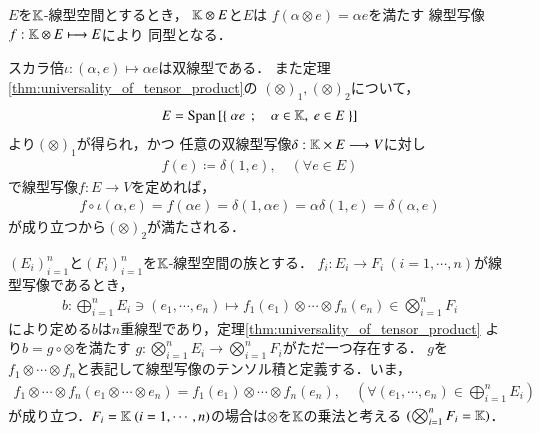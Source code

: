 	\begin{screen}
		\begin{thm}[スカラーとのテンソル積]\label{thm:tensor_product_with_scalar}
			$E$を$\mathbb{K}$-線型空間とするとき，
			$\mathbb{K} \otimes E$と$E$は
			$f(\alpha \otimes e) = \alpha e$を満たす
			線型写像$f:\mathbb{K} \otimes E \longmapsto E$により
			同型となる．
		\end{thm}
	\end{screen}
	
	\begin{prf}
		スカラ倍$\iota:(\alpha, e) \longmapsto \alpha e$は双線型である．
		また定理\ref{thm:universality_of_tensor_product}の
		$(\otimes)_1,(\otimes)_2$について，
		\begin{align}
			E = \mathrm{Span}\left[ \left\{\ \alpha e\ \, ; \quad \alpha \in \mathbb{K},\ e \in E\ \right\} \right]
		\end{align}
		より$(\otimes)_1$が得られ，かつ
		任意の双線型写像$\delta:\mathbb{K} \times E \longrightarrow V$に対し
		\begin{align}
			f(e) \coloneqq \delta(1,e),
			\quad (\forall e \in E)
		\end{align}
		で線型写像$f:E \longrightarrow V$を定めれば，
		\begin{align}
			f \circ \iota (\alpha,e) 
			= f(\alpha e) 
			= \delta(1,\alpha e)
			= \alpha \delta(1,e)
			= \delta (\alpha ,e)
		\end{align}
		が成り立つから$(\otimes)_2$が満たされる．
		\QED
	\end{prf}
	
	\begin{screen}
		\begin{dfn}[線型写像のテンソル積]
				$(E_i)_{i=1}^n$と$(F_i)_{i=1}^n$を$\mathbb{K}$-線型空間の族とする．
				$f_i:E_i \longrightarrow F_i\ (i=1,\cdots,n)$が線型写像であるとき，
				\begin{align}
					b: \bigoplus_{i=1}^n E_i \ni (e_1,\cdots,e_n)
					\longmapsto f_1(e_1)\otimes \cdots \otimes f_n(e_n)
					\in \bigotimes_{i=1}^n F_i
				\end{align}
				により定める$b$は$n$重線型であり，定理\ref{thm:universality_of_tensor_product}
				より$b = g \circ \otimes$を満たす
				$g:\bigotimes_{i=1}^{n} E_i \longrightarrow \bigotimes_{i=1}^{n} F_i$がただ一つ存在する．
				$g$を$f_1 \otimes \cdots \otimes f_n$と表記して線型写像のテンソル積と定義する．いま，
				\begin{align}
					f_1 \otimes \cdots \otimes f_n(e_1 \otimes \cdots \otimes e_n)
					= f_1(e_1)\otimes \cdots \otimes f_n(e_n),
					\quad (\forall (e_1,\cdots,e_n) \in \bigoplus_{i=1}^n E_i)
				\end{align}
				が成り立つ．$F_i = \K\ (i=1,\cdots,n)$の場合は$\otimes$を$\mathbb{K}$の乗法と考える
				$(\bigotimes_{i=1}^n F_i = \mathbb{K})$．
		\end{dfn}
	\end{screen}
	
